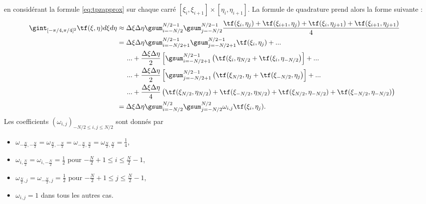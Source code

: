 en considérant la formule \eqref{eq:tpzapprox} sur chaque carré $\left[ \xi_i, \xi_{i+1} \right] \times \left[ \eta_i, \eta_{i+1} \right]$. La formule de quadrature prend alors la forme suivante :
\begin{align*}
\gint_{[-\pi/4,\pi/4]^2} \tf(\xi, \eta) d\xi d\eta & \approx \Delta \xi \Delta \eta \gsum_{i=-N/2}^{N/2-1} \gsum_{j=-N/2}^{N/2-1} \dfrac{\tf(\xi_{i}, \eta_{j}) + \tf(\xi_{i+1}, \eta_{j}) + \tf(\xi_{i}, \eta_{j+1}) + \tf(\xi_{i+1}, \eta_{j+1}) }{4} \\
	& = \Delta \xi \Delta \eta \gsum_{i = -N/2+1}^{N/2-1} \gsum_{j = -N/2+1}^{N/2-1} \tf(\xi_i, \eta_j) + ... \\
	& \hspace{5mm} ... + \dfrac{\Delta \xi \Delta \eta}{2} \left[ \gsum_{i=-N/2+1}^{N/2-1} \left( \tf(\xi_i, \eta_{N/2} + \tf(\xi_i, \eta_{-N/2} \right) \right] + ...\\
	& \hspace{5mm} ... + \dfrac{\Delta \xi \Delta \eta}{2} \left[ \gsum_{j=-N/2+1}^{N/2-1} \left( \tf(\xi_{N/2}, \eta_{j} + \tf(\xi_{-N/2}, \eta_{j} \right) \right]+ ... \\
	& \hspace{5mm} ... + \dfrac{\Delta \xi \Delta \eta}{4} \left( \tf(\xi_{N/2}, \eta_{N/2}) + \tf(\xi_{-N/2}, \eta_{N/2}) + \tf(\xi_{N/2}, \eta_{-N/2})+ \tf(\xi_{-N/2}, \eta_{-N/2}) \right)\\
	& = \Delta \xi \Delta \eta \gsum_{i=-N/2}^{N/2} \gsum_{j=-N/2}^{N/2} \omega_{i,j} \tf(\xi_i, \eta_j).
\end{align*}
Les coefficients $(\omega_{i,j})_{-N/2 \leq i,j \leq N/2}$ sont donnés par
\begin{itemize}
\item $\omega_{-\frac{N}{2},-\frac{N}{2}}=\omega_{\frac{N}{2},-\frac{N}{2}}=\omega_{-\frac{N}{2},\frac{N}{2}}=\omega_{\frac{N}{2},\frac{N}{2}}=\frac{1}{4}$,
\item $\omega_{i,\frac{N}{2}}=\omega_{i,-\frac{N}{2}}=\frac{1}{2}$ pour $-\frac{N}{2}+1 \leq i \leq \frac{N}{2}-1$,
\item $\omega_{\frac{N}{2},j}=\omega_{-\frac{N}{2},j}=\frac{1}{2}$ pour $-\frac{N}{2}+1 \leq j \leq \frac{N}{2}-1$,
\item $\omega_{i,j}=1$ dans tous les autres cas.
\end{itemize}

